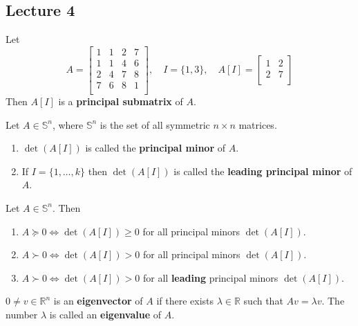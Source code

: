 \subsection{Lecture 4}

\begin{problem}
  
\end{problem}
\begin{definition}
  Let $$A = \begin{bmatrix}
    1 & 1 & 2 & 7 \\
    1 & 1 & 4 & 6 \\
    2 & 4 & 7 & 8 \\
    7 & 6 & 8 & 1 \\
  \end{bmatrix}, \quad I = \{1,3\}, \quad A[I] = \begin{bmatrix}
    1 & 2 \\
    2 & 7 \\
  \end{bmatrix}$$
  Then $A[I]$ is a \textbf{principal submatrix} of $A$.
\end{definition}
\begin{definition}
  Let $A \in \mathbb S^n$, where $\mathbb S^n$ is the set of all symmetric $n \times n$ matrices.
\begin{enumerate}
  \item $\det(A[I])$ is called the \textbf{principal minor} of $A$.
  \item If $I = \{1,\ldots, k\}$ then $\det(A[I])$ is called the \textbf{leading principal minor} of $A$.
\end{enumerate}
\end{definition}
\begin{proposition}
  Let $A \in \mathbb S^n$. Then
  \begin{enumerate}
    \item $A \succeq 0 \iff \det(A[I]) \geq 0$ for all principal minors $\det(A[I])$.
    \item $A \succ 0 \iff \det(A[I]) > 0$ for all principal minors $\det(A[I])$.
    \item $A \succ 0 \iff \det(A[I]) > 0$ for all \textbf{leading} principal minors $\det(A[I])$.
  \end{enumerate}
\end{proposition}
\begin{definition}
  $0 \neq v \in \mathbb R^n$ is an \textbf{eigenvector} of $A$ if there exists $\lambda \in \mathbb R$ such that $Av = \lambda v$. The number $\lambda$ is called an \textbf{eigenvalue} of $A$.
\end{definition}
